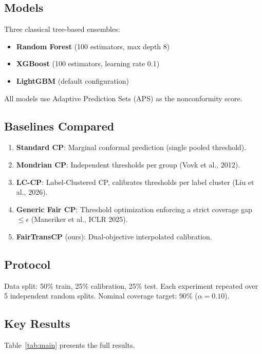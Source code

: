 \documentclass[11pt,a4paper]{article}
\begin{document}
\subsection{Models}
Three classical tree-based ensembles:
\begin{itemize}[leftmargin=2em]
    \item \textbf{Random Forest} (100 estimators, max depth 8)
    \item \textbf{XGBoost} (100 estimators, learning rate 0.1)
    \item \textbf{LightGBM} (default configuration)
\end{itemize}
All models use Adaptive Prediction Sets (APS) as the nonconformity score.

\subsection{Baselines Compared}
\begin{enumerate}[leftmargin=2em]
    \item \textbf{Standard CP}: Marginal conformal prediction (single pooled threshold).
    \item \textbf{Mondrian CP}: Independent thresholds per group (Vovk et al., 2012).
    \item \textbf{LC-CP}: Label-Clustered CP, calibrates thresholds per label cluster (Liu et al., 2026).
    \item \textbf{Generic Fair CP}: Threshold optimization enforcing a strict coverage gap $\le \epsilon$ (Maneriker et al., ICLR 2025).
    \item \textbf{FairTransCP} (ours): Dual-objective interpolated calibration.
\end{enumerate}

\subsection{Protocol}
Data split: 50\% train, 25\% calibration, 25\% test. Each experiment repeated over 5 independent random splits. Nominal coverage target: 90\% ($\alpha = 0.10$).

\subsection{Key Results}

Table~\ref{tab:main} presents the full results.
\end{document}
